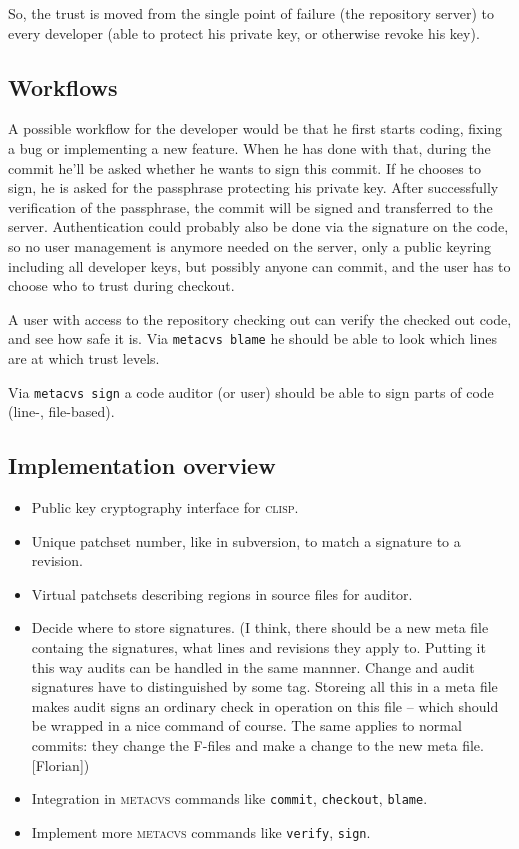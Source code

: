 \documentclass[fleqn, 10pt, a4paper]{article}
\begin{document}
So, the trust is moved from the single point of failure (the repository
server) to every developer (able to protect his private key, or otherwise
revoke his key).

\subsection{Workflows}
A possible workflow for the developer would be that he first starts coding,
fixing a bug or implementing a new feature. When he has done with that,
during the commit he'll be asked whether he wants to sign this commit.
If he chooses to sign, he is asked for the passphrase protecting
his private key. After successfully verification of the passphrase,
the commit will be signed and transferred to the server.
Authentication could probably also be done via the signature on the code,
so no user management is anymore needed on the server, only a public keyring
including all developer keys, but possibly anyone can commit, and the user
has to choose who to trust during checkout.

A user with access to the repository checking out can verify the checked
out code, and see how safe it is.
Via \texttt{metacvs blame} he should be able to look which lines are
at which trust levels.

Via \texttt{metacvs sign} a code auditor (or user) should be able to
sign parts of code (line-, file-based).

\subsection{Implementation overview}
\begin{itemize}
\item Public key cryptography interface for \textsc{clisp}.
\item Unique patchset number, like in subversion, to match a signature to a revision.
\item Virtual patchsets describing regions in source files for auditor.
\item Decide where to store signatures.
(I think, there should be a new meta file containg the signatures, what
lines and revisions they apply to. Putting it this way audits can be handled
in the same mannner. Change and audit signatures have to distinguished by
some tag. Storeing all this in a meta file makes audit signs an
ordinary check in operation on this file -- which should be wrapped in
a nice command of course. The same applies to normal commits: they
change the F-files and make a change to the new meta file. [Florian])
\item Integration in \textsc{metacvs} commands like \texttt{commit},
\texttt{checkout}, \texttt{blame}.
\item Implement more \textsc{metacvs} commands like \texttt{verify},
\texttt{sign}.
\end{itemize}
\end{document}
